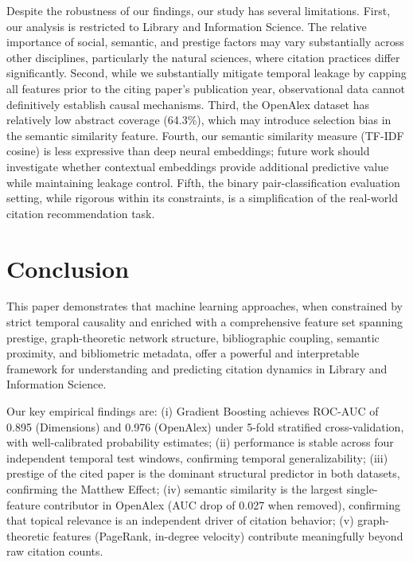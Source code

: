 \documentclass[12pt,a4paper]{article}
\begin{document}
Despite the robustness of our findings, our study has several limitations. First,
our analysis is restricted to Library and Information Science. The relative
importance of social, semantic, and prestige factors may vary substantially across
other disciplines, particularly the natural sciences, where citation practices
differ significantly. Second, while we substantially mitigate temporal leakage by
capping all features prior to the citing paper's publication year, observational
data cannot definitively establish causal mechanisms. Third, the OpenAlex dataset
has relatively low abstract coverage (64.3\%), which may introduce selection bias
in the semantic similarity feature. Fourth, our semantic similarity measure (TF-IDF
cosine) is less expressive than deep neural embeddings; future work should
investigate whether contextual embeddings provide additional predictive value while
maintaining leakage control. Fifth, the binary pair-classification evaluation
setting, while rigorous within its constraints, is a simplification of the real-world
citation recommendation task.

\section{Conclusion}
\label{sec:conclusion}

This paper demonstrates that machine learning approaches, when constrained by
strict temporal causality and enriched with a comprehensive feature set spanning
prestige, graph-theoretic network structure, bibliographic coupling, semantic
proximity, and bibliometric metadata, offer a powerful and interpretable framework
for understanding and predicting citation dynamics in Library and Information Science.

Our key empirical findings are: (i) Gradient Boosting achieves ROC-AUC of 0.895
(Dimensions) and 0.976 (OpenAlex) under 5-fold stratified cross-validation, with
well-calibrated probability estimates; (ii) performance is stable across four
independent temporal test windows, confirming temporal generalizability; (iii)
prestige of the cited paper is the dominant structural predictor in both datasets,
confirming the Matthew Effect; (iv) semantic similarity is the largest single-feature
contributor in OpenAlex (AUC drop of 0.027 when removed), confirming that topical
relevance is an independent driver of citation behavior; (v) graph-theoretic features
(PageRank, in-degree velocity) contribute meaningfully beyond raw citation counts.
\end{document}
